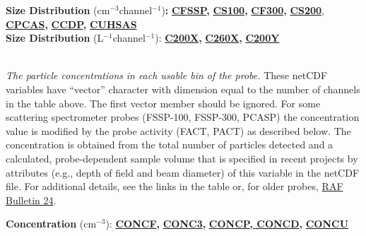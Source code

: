 \begin{hangparagraphs}
\textbf{}%
\noindent\begin{minipage}[t]{1\columnwidth}%
\textbf{Size Distribution} ($\mathrm{cm}{}^{-3}$channel$^{-1}$)\textbf{:}\textbf{
}\textbf{\uline{CFSSP}}\textbf{,
}\textbf{\uline{CS100}}\textbf{}\textbf{,
}\textbf{\uline{CF300}}\textbf{,
}\textbf{\uline{CS200}},\textbf{
}\textbf{\uline{CPCAS}}\textbf{,
}\textbf{\uline{CCDP}}\textbf{,
}\textbf{\uline{CUHSAS}}\\
\textbf{Size Distribution }(L\textbf{$^{-1}$}channel$^{-1}$):\textbf{
}\textbf{\uline{C200X}}\textbf{,
}\textbf{\uline{C260X}}\textbf{,
}\textbf{\uline{C200Y}}%
\end{minipage}\textbf{\label{CUHSAS}}\\
\emph{The particle concentrations}
\emph{in each usable bin of the probe.} These netCDF variables have
``vector'' character with dimension equal to the number of channels
in the table above. The first vector member should be ignored. For
some scattering spectrometer
probes (FSSP-100, FSSP-300, PCASP)
the concentration value is modified by the probe activity (FACT, PACT)
as described below. The concentration is obtained from the total number
of particles detected and a calculated, probe-dependent sample volume
that is specified in recent projects by attributes (e.g., depth of
field and beam diameter) of this variable in the netCDF file. For
additional details, see the links in the table 
or, for older probes, \href{http://www.eol.ucar.edu/raf/Bulletins/bulletin24.html}{RAF Bulletin 24}.

\begin{singlespace}
\textbf{}%
\noindent\begin{minipage}[t]{1\columnwidth}%
\begin{hangparagraphs}
\begin{singlespace}
\textbf{Concentration }(cm$^{-3}$):\textbf{
}\textbf{\uline{CONCF}}\textbf{,
}\textbf{\uline{CONC3}}\textbf{,
}\textbf{\uline{CONCP, CONCD}}\textbf{,
}\textbf{\uline{CONCU}}


\end{singlespace}
\end{hangparagraphs}
\end{minipage}
\end{singlespace}
\end{hangparagraphs}
